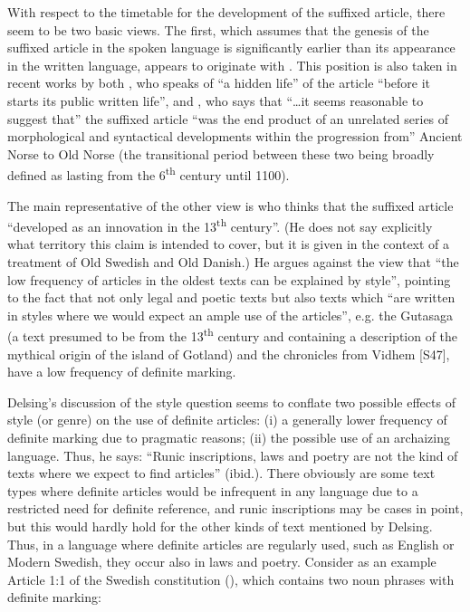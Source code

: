With respect to the timetable for the development of the suffixed article, there seem to be two basic views. The first, which assumes that the genesis of the suffixed article in the spoken language is significantly earlier than its appearance in the written language, appears to originate with \citet{Neckel1924}.  This position is also taken in recent works by both \citet[142]{Perridon1989}, who speaks of “a hidden life” of the article “before it starts its public written life”, and \citet[723]{Syrett2002}, who says that “…it seems reasonable to suggest that” the suffixed article “was the end product of an unrelated series of morphological and syntactical developments within the progression from” Ancient Norse to Old Norse (the transitional period between these two being broadly defined as lasting from the 6\textsuperscript{th} century until 1100). 


The main representative of the other view is \citet[938-939]{Delsing2002} who thinks that the suffixed article “developed as an innovation in the 13\textsuperscript{th} century”. (He does not say explicitly what territory this claim is intended to cover, but it is given in the context of a treatment of Old Swedish and Old Danish.) He argues against the view that “the low frequency of articles in the oldest texts can be explained by style”, pointing to the fact that not only legal and poetic texts but also texts which “are written in styles where we would expect an ample use of the articles”,  e.g. the Gutasaga (a text presumed to be from the 13\textsuperscript{th} century and containing a description of the mythical origin of the island of Gotland) and the chronicles from Vidhem [S47], have a low frequency of definite marking. 


Delsing’s discussion of the style question seems to conflate two possible effects of style (or genre) on the use of definite articles: (i) a generally lower frequency of definite marking due to pragmatic reasons; (ii) the possible use of an archaizing language. Thus, he says: “Runic inscriptions, laws and poetry are not the kind of texts where we expect to find articles” (ibid.). There obviously are some text types where definite articles would be infrequent in any language due to a restricted need for definite reference, and runic inscriptions may be cases in point, but this would hardly hold for the other kinds of text mentioned by Delsing. Thus, in a language where definite articles are regularly used, such as English or Modern Swedish, they occur also in laws and poetry. Consider as an example Article 1:1 of the Swedish constitution (), which contains two noun phrases with definite marking:

